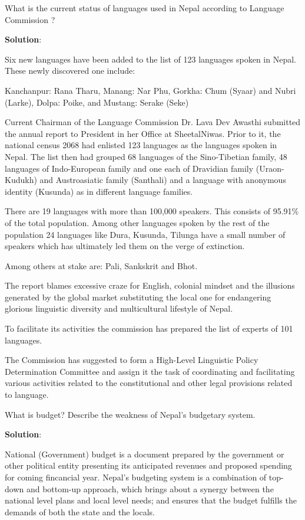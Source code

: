 \documentclass[
  openany]{book}
\newcommand{\question}{\item}
\newenvironment{solution}{ {\bfseries Solution}:}{}
\begin{document}
\begin{questions}
\question What is the current status of languages used in Nepal according to Language Commission ?

\begin{solution}

Six new languages have been added to the list of 123 languages spoken in Nepal. These newly discovered one include:

Kanchanpur: Rana Tharu,
Manang: Nar Phu,
Gorkha: Chum (Syaar) and Nubri (Larke),
Dolpa: Poike, and
Mustang: Serake (Seke)

Current Chairman of the Language Commission Dr. Lava Dev Awasthi submitted the annual report to President in her Office at SheetalNiwas. Prior to it, the national census 2068 had enlisted 123 languages as the languages spoken in Nepal. The list then had grouped 68 languages of the Sino-Tibetian family, 48 languages of Indo-European family and one each of Dravidian family (Uraon-Kudukh) and Austroasiatic family (Santhali) and a language with anonymous identity (Kusunda) as in different language families.

There are 19 languages with more than 100,000 speakers. This consists of 95.91\% of the total population. Among other languages spoken by the rest of the population 24 languages like Dura, Kusunda, Tilunga have a small number of speakers which has ultimately led them on the verge of extinction.

Among others at stake are: Pali, Sankskrit and Bhot.

The report blames excessive craze for English, colonial mindset and the illusions generated by the global market substituting the local one for endangering glorious linguistic diversity and multicultural lifestyle of Nepal.

To facilitate its activities the commission has prepared the list of experts of 101 languages.

The Commission has suggested to form a High-Level Linguistic Policy Determination Committee and assign it the task of coordinating and facilitating various activities related to the constitutional and other legal provisions related to language.

\end{solution}

\question What is budget? Describe the weakness of Nepal's budgetary system.

\begin{solution}

National (Government) budget is a document prepared by the government or other political entity presenting its anticipated revenues and proposed spending for coming fincancial year. Nepal's budgeting system is a combination of top-down and bottom-up approach, which brings about a synergy between the national level plans and local level needs; and ensures that the budget fulfills the demands of both the state and the locals.


\end{solution}
\end{questions}
\end{document}
